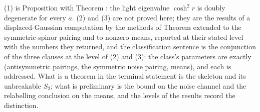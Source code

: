 (1) is Proposition  with Theorem : the light eigenvalue $\cosh^{2}r$ is doubly degenerate for every $a$. (2) and (3) are not proved here; they are the results of a displaced-Gaussian computation by the methods of Theorem  extended to the symmetric-spinor pairing and to nonzero means, reported at their stated level with the numbers they returned, and the classification sentence is the conjunction of the three clauses at the level of (2) and (3): the class's parameters are exactly (antisymmetric pairings, the symmetric noise pairing, means), and each is addressed. What is a theorem in the terminal statement is the skeleton and its unbreakable $S_{2}$; what is preliminary is the bound on the noise channel and the relabelling conclusion on the means, and the levels of the results record the distinction.
